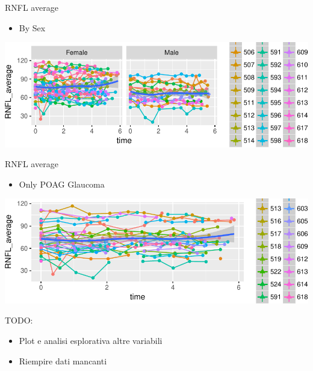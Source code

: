 \documentclass[ignorenonframetext,]{beamer}
\providecommand{\tightlist}{%
  \setlength{\itemsep}{0pt}\setlength{\parskip}{0pt}}
\begin{document}
\begin{frame}{RNFL average}

\begin{itemize}
\tightlist
\item
  By Sex
\end{itemize}

\includegraphics{analisi_exp_markdown_files/figure-beamer/unnamed-chunk-9-1.pdf}

\end{frame}

\begin{frame}{RNFL average}

\begin{itemize}
\tightlist
\item
  Only POAG Glaucoma
\end{itemize}

\includegraphics{analisi_exp_markdown_files/figure-beamer/unnamed-chunk-10-1.pdf}

\end{frame}

\begin{frame}{TODO:}

\begin{itemize}
\tightlist
\item
  Plot e analisi esplorativa altre variabili
\item
  Riempire dati mancanti
\end{itemize}

\end{frame}
\end{document}
